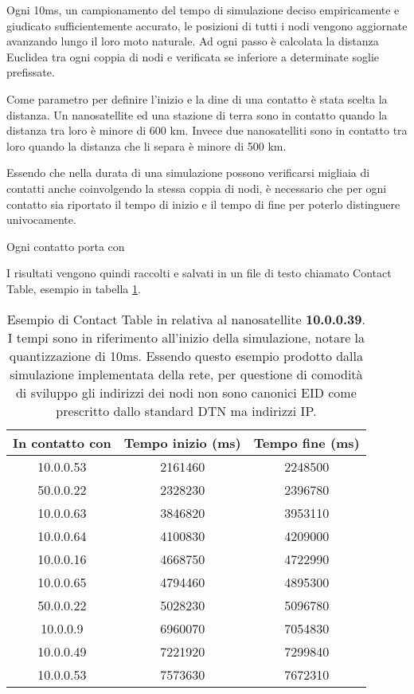 \documentclass[12pt,a4paper,oneside]{book}
\begin{document}
		Ogni 10ms, un campionamento del tempo di simulazione deciso empiricamente e giudicato sufficientemente accurato, le posizioni di tutti i nodi vengono aggiornate avanzando lungo il loro moto naturale. Ad ogni passo è calcolata la distanza Euclidea tra ogni coppia di nodi e verificata se inferiore a determinate soglie prefissate.		
		
		Come parametro per definire l'inizio e la dine di una contatto è stata scelta la distanza. Un nanosatellite ed una stazione di terra sono in contatto quando la distanza tra loro è minore di 600 km. Invece due nanosatelliti sono in contatto tra loro quando la distanza che li separa è minore di 500 km.

		Essendo che nella durata di una simulazione possono verificarsi migliaia di contatti anche coinvolgendo la stessa coppia di nodi, è necessario che per ogni contatto sia riportato il tempo di inizio e il tempo di fine per poterlo distinguere univocamente. 
		
		Ogni contatto porta con

		I risultati vengono quindi raccolti e salvati in un file di testo chiamato Contact Table, esempio in tabella \ref{tab:ctorig}.
		
		\begin{table}
			\begin{center}
				\begin{tabular}{| c | c | c |}
					\hline
					In contatto con & Tempo inizio (ms) & Tempo fine (ms) \\
					\hline
					10.0.0.53 & 2161460 & 2248500 \\
					50.0.0.22 & 2328230 & 2396780 \\
					10.0.0.63 & 3846820 & 3953110 \\
					10.0.0.64 & 4100830 & 4209000 \\
					10.0.0.16 & 4668750 & 4722990 \\
					10.0.0.65 & 4794460 & 4895300 \\
					50.0.0.22 & 5028230 & 5096780 \\
					10.0.0.9 & 6960070 & 7054830 \\
					10.0.0.49 & 7221920 & 7299840 \\
					10.0.0.53 & 7573630 & 7672310 \\
					\hline
				\end{tabular}
			\caption{Esempio di Contact Table in relativa al nanosatellite \textbf{10.0.0.39}. I tempi sono in riferimento all'inizio della simulazione, notare la quantizzazione di 10ms. Essendo questo esempio prodotto dalla simulazione implementata della rete, per questione di comodità di sviluppo gli indirizzi dei nodi non sono canonici EID come prescritto dallo standard DTN ma indirizzi IP.}
			\label{tab:ctorig}
			\end{center}			
		\end{table}
\end{document}
